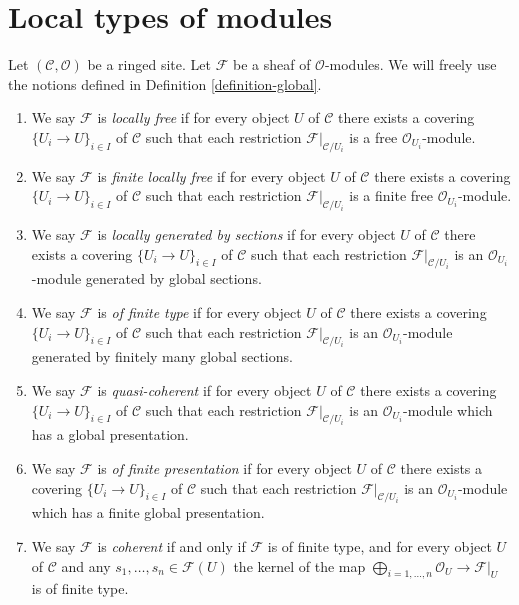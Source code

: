 \section{Local types of modules}
\label{section-local}

\begin{definition}
\label{definition-site-local}
Let $(\mathcal{C}, \mathcal{O})$ be a ringed site.
Let $\mathcal{F}$ be a sheaf of $\mathcal{O}$-modules.
We will freely use the notions defined in
Definition \ref{definition-global}.
\begin{enumerate}
\item We say $\mathcal{F}$ is {\it locally free}
if for every object $U$ of $\mathcal{C}$ there exists a covering
$\{U_i \to U\}_{i \in I}$ of $\mathcal{C}$ such that each restriction
$\mathcal{F}|_{\mathcal{C}/U_i}$ is a free
$\mathcal{O}_{U_i}$-module.
\item We say $\mathcal{F}$ is {\it finite locally free}
if for every object $U$ of $\mathcal{C}$ there exists a covering
$\{U_i \to U\}_{i \in I}$ of $\mathcal{C}$ such that each restriction
$\mathcal{F}|_{\mathcal{C}/U_i}$ is a finite free
$\mathcal{O}_{U_i}$-module.
\item We say $\mathcal{F}$ is {\it locally generated by sections}
if for every object $U$ of $\mathcal{C}$ there exists a covering
$\{U_i \to U\}_{i \in I}$ of $\mathcal{C}$ such that each restriction
$\mathcal{F}|_{\mathcal{C}/U_i}$ is an
$\mathcal{O}_{U_i}$-module generated by global sections.
\item We say $\mathcal{F}$ is {\it of finite type}
if for every object $U$ of $\mathcal{C}$ there exists a covering
$\{U_i \to U\}_{i \in I}$ of $\mathcal{C}$ such that each restriction
$\mathcal{F}|_{\mathcal{C}/U_i}$ is an
$\mathcal{O}_{U_i}$-module generated by finitely many global sections.
\item We say $\mathcal{F}$ is {\it quasi-coherent}
if for every object $U$ of $\mathcal{C}$ there exists a covering
$\{U_i \to U\}_{i \in I}$ of $\mathcal{C}$ such that each restriction
$\mathcal{F}|_{\mathcal{C}/U_i}$ is an
$\mathcal{O}_{U_i}$-module which has a global presentation.
\item We say $\mathcal{F}$ is {\it of finite presentation}
if for every object $U$ of $\mathcal{C}$ there exists a covering
$\{U_i \to U\}_{i \in I}$ of $\mathcal{C}$ such that each restriction
$\mathcal{F}|_{\mathcal{C}/U_i}$ is an
$\mathcal{O}_{U_i}$-module which has a finite global presentation.
\item We say $\mathcal{F}$ is {\it coherent} if and only if
$\mathcal{F}$ is of finite type, and for every object
$U$ of $\mathcal{C}$ and any $s_1, \ldots, s_n \in \mathcal{F}(U)$
the kernel of the map
$\bigoplus_{i = 1, \ldots, n} \mathcal{O}_U \to \mathcal{F}|_U$
is of finite type.
\end{enumerate}
\end{definition}

